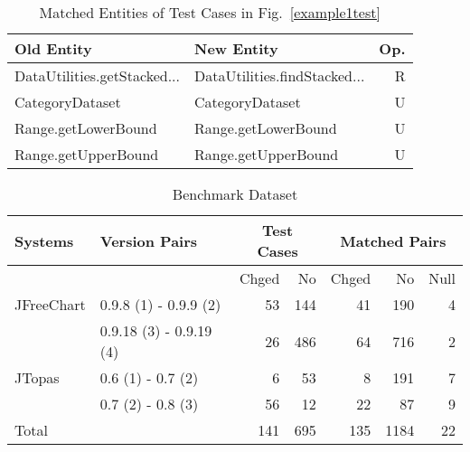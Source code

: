 \begin{table}
\small
\caption{Matched Entities of Test Cases in Fig.~\ref{example1test}}
\begin{tabular}{llr}
\addlinespace
\toprule
Old Entity & New Entity & Op. \\
\midrule
DataUtilities.getStacked... & DataUtilities.findStacked... & R \\
CategoryDataset & CategoryDataset & U \\
Range.getLowerBound & Range.getLowerBound & U \\
Range.getUpperBound & Range.getUpperBound & U \\
\bottomrule
\end{tabular}%
\label{matches}
\end{table}


\begin{table}[t]
\small
  \centering
  \caption{Benchmark Dataset}
  \setlength{\tabcolsep}{2.5pt}
	\begin{tabular}{l|l|rr|rrr}
    \addlinespace
    \toprule
    Systems & Version Pairs & \multicolumn{2}{c|}{Test Cases} & \multicolumn{3}{c}{Matched Pairs} \\
    \midrule
      &       & Chged & No & Chged & No & Null \\
    \hline
JFreeChart & 0.9.8 (1) - 0.9.9 (2) & 53    & 144   & 41    & 190   & 4 \\
      &  0.9.18 (3) - 0.9.19 (4) & 26    & 486   & 64    & 716   & 2 \\
JTopas & 0.6 (1) - 0.7 (2) & 6     & 53    & 8     & 191   & 7 \\
      & 0.7 (2) - 0.8 (3) & 56    & 12    & 22    & 87    & 9 \\
\midrule
Total &       & 141   & 695   & 135   & 1184  & 22 \\
\bottomrule
    \end{tabular}%
  \label{tab:dataset}
\end{table}


